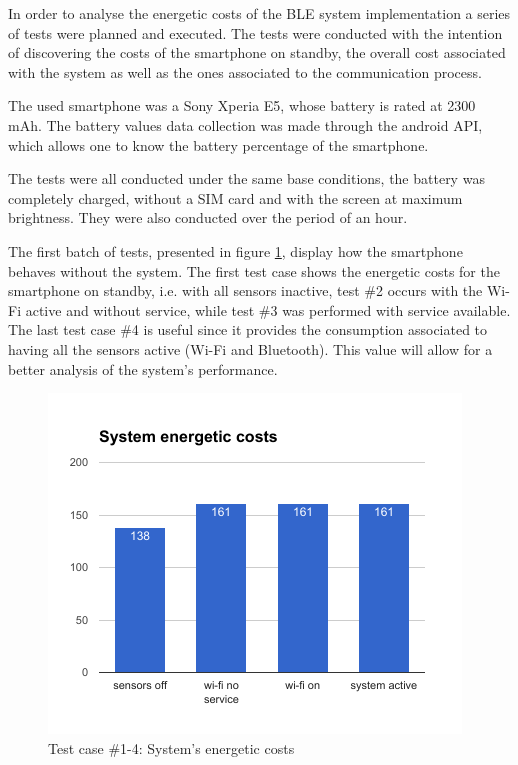 \documentclass[a4paper]{IEEEtran}
\begin{document}
 
 
 
In order to analyse the energetic costs of the BLE system implementation a series of tests were planned and executed. The tests were conducted with the intention of discovering the costs of the smartphone on standby, the overall cost associated with the system as well as the ones associated to the communication process.  
 
 
The used smartphone was a Sony Xperia E5, whose battery is rated at 2300 mAh. The battery values data collection was made through the android API, which allows one to know the battery percentage of the smartphone. 
 
 
The tests were all conducted under the same base conditions, the battery was completely charged, without a SIM card and with the screen at maximum brightness. They were also conducted over the period of an hour. 
 
 
The first batch of tests, presented in figure \ref{fig:syson}, display how the smartphone behaves without the system. The first test case shows the energetic costs for the smartphone on standby, i.e. with all sensors inactive, test \#2 occurs with the Wi-Fi active and without service, while test \#3 was performed with service available. The last test case \#4 is useful since it provides the consumption associated to having all the sensors active (Wi-Fi and Bluetooth). This value will allow for a better analysis of the system's performance. 
 
 
\begin{figure} 
\centering 
\includegraphics[width=1\linewidth]{figures/system-on.png} 
\caption[Test case \#1-4: System's energetic costs]{Test case \#1-4: System's energetic costs} 
\label{fig:syson} 
\end{figure} 
 
\end{document}
